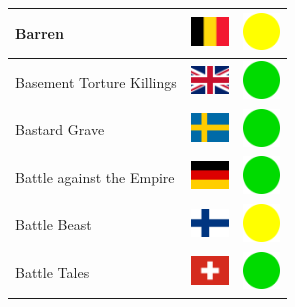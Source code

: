 \documentclass[12pt, a4paper, twoside]{report}
\begin{document}
\begin{center}
\begin{longtable}{|p{5cm}|p{2cm}|p{2cm}|}
 Barren                                                     & \includegraphics[width=1cm]{../img/flags/be} &   \includegraphics[width=1cm]{../likes/m} \\ \hline
 Basement Torture Killings                                  & \includegraphics[width=1cm]{../img/flags/gb} &   \includegraphics[width=1cm]{../likes/y} \\ \hline
 Bastard Grave                                              & \includegraphics[width=1cm]{../img/flags/se} &   \includegraphics[width=1cm]{../likes/y} \\ \hline
 Battle against the Empire                                  & \includegraphics[width=1cm]{../img/flags/de} &   \includegraphics[width=1cm]{../likes/y} \\ \hline
 Battle Beast                                               & \includegraphics[width=1cm]{../img/flags/fi} &   \includegraphics[width=1cm]{../likes/m} \\ \hline
 Battle Tales                                               & \includegraphics[width=1cm]{../img/flags/ch} &   \includegraphics[width=1cm]{../likes/y} \\ \hline

\end{longtable}
\end{center}
\end{document}

